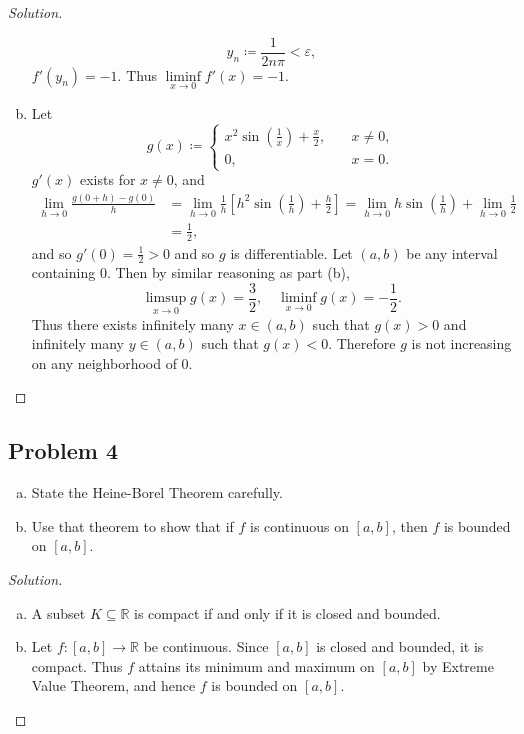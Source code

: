 \documentclass[12pt]{article}
\newcommand{\real}{\mathbb{R}}
\newcommand\paren[1]{\left( #1 \right)}
\newcommand{\sqbrack}[1]{\left [ #1 \right ]}
\newcommand{\eps}{\varepsilon}
\theoremstyle{definition}
\begin{document}
\begin{proof}[Solution]
\begin{enumerate}[(a)]
        \[
            y_n \coloneqq \frac{1}{2n\pi} < \eps,
        \]
        $f'(y_n) = -1$. Thus $\liminf\limits_{x \to 0} f'(x) = -1$.
        \item Let 
        \[
            g(x) \coloneqq 
            \begin{cases}
                x^2 \sin \paren{ \frac{1}{x} } + \frac{x}{2} , & \quad x \neq 0, \\
                0 , & \quad x = 0.
            \end{cases}
        \]
        $g'(x)$ exists for $x \neq 0$, and
        \begin{align*}
            \lim\limits_{h \to 0} \frac{g(0+h) - g(0)}{h} & = \lim\limits_{h \to 0} \frac{1}{h} \sqbrack{ h^2 \sin \paren{ \frac{1}{h} } + \frac{h}{2} } = \lim\limits_{h \to 0} h \sin \paren{ \frac{1}{h} } + \lim\limits_{h \to 0} \frac{1}{2} \\
            & = \frac{1}{2},
        \end{align*}
        and so $g'(0) = \frac{1}{2} > 0$ and so $g$ is differentiable. Let $(a,b)$ be any interval containing $0$. Then by similar reasoning as part (b), 
        \[
            \limsup\limits_{x \to 0} g(x) = \frac{3}{2} , \quad \liminf\limits_{x \to 0} g(x) = -\frac{1}{2}.
        \]
        Thus there exists infinitely many $x \in (a,b)$ such that $g(x) > 0$ and infinitely many $y \in (a,b)$ such that $g(x) < 0$. Therefore $g$ is not increasing on any neighborhood of $0$.
    \end{enumerate}
\end{proof}

\subsection{Problem 4}
\begin{enumerate}[(a)]
    \item State the Heine-Borel Theorem carefully.
    \item Use that theorem to show that if $f$ is continuous on $[a,b]$, then $f$ is bounded on $[a,b]$.
\end{enumerate}
\begin{proof}[Solution]
    \noindent
    \begin{enumerate}[(a)]
        \item A subset $K \subseteq \real$ is compact if and only if it is closed and bounded.
        \item Let $f : [a,b] \to \real$ be continuous. Since $[a,b]$ is closed and bounded, it is compact. Thus $f$ attains its minimum and maximum on $[a,b]$ by Extreme Value Theorem, and hence $f$ is bounded on $[a,b]$.
    \end{enumerate}
\end{proof}
\end{document}
